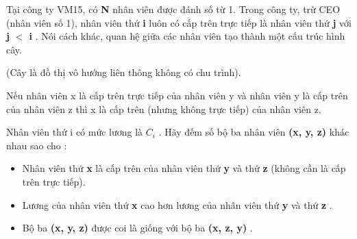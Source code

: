 Tại công ty VM15, có \textbf{ N } nhân viên được đánh số từ 1. Trong công ty, trừ CEO (nhân viên số 1), nhân viên thứ \textbf{ i } luôn có cấp trên trực tiếp là nhân viên thứ \textbf{ j } với \textbf{ j }\textbf{ $<$ i } . Nói cách khác, quan hệ giữa các nhân viên tạo thành một cấu trúc hình cây.

(Cây là đồ thị vô hướng liên thông không có chu trình).

Nếu nhân viên x là cấp trên trực tiếp của nhân viên y và nhân viên y là cấp trên của nhân viên z thì x là cấp trên (nhưng không trực tiếp) của nhân viên z.

Nhân viên thứ i có mức lương là \textbf{ $C_{i}$} . Hãy đếm số bộ ba nhân viên \textbf{ (x, y, z) } khác nhau sao cho :
\begin{itemize}
	\item Nhân viên thứ \textbf{ x } là cấp trên của nhân viên thứ \textbf{ y } và thứ \textbf{ z } (không cần là cấp trên trực tiếp).
	\item Lương của nhân viên thứ \textbf{ x } cao hơn lương của nhân viên thứ \textbf{ y } và thứ \textbf{ z } .
	\item Bộ ba \textbf{ (x, y, z) } được coi là giống với bộ ba \textbf{ (x, z, y) } .
\end{itemize}